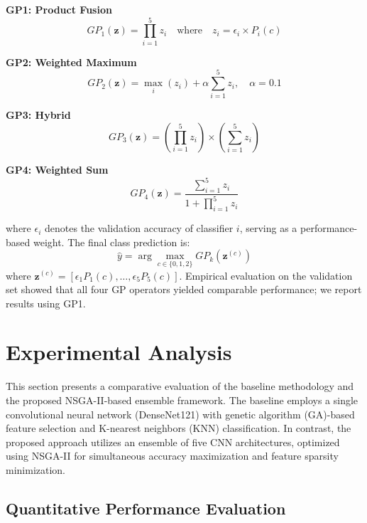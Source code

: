 \documentclass{article}
\begin{document}
\textbf{GP1: Product Fusion}
\begin{equation}
	GP_1(\mathbf{z}) = \prod_{i=1}^{5} z_i \quad \text{where} \quad z_i = \epsilon_i \times P_i(c)
\end{equation}

\textbf{GP2: Weighted Maximum}
\begin{equation}
	GP_2(\mathbf{z}) = \max_i(z_i) + \alpha \sum_{i=1}^{5} z_i, \quad \alpha=0.1
\end{equation}

\textbf{GP3: Hybrid}
\begin{equation}
	GP_3(\mathbf{z}) = \left(\prod_{i=1}^{5} z_i\right) \times \left(\sum_{i=1}^{5} z_i\right)
\end{equation}

\textbf{GP4: Weighted Sum}
\begin{equation}
	GP_4(\mathbf{z}) = \frac{\sum_{i=1}^{5} z_i}{1 + \prod_{i=1}^{5} z_i}
\end{equation}

where $\epsilon_i$ denotes the validation accuracy of classifier $i$, serving as a performance-based weight. The final class prediction is:
\begin{equation}
	\hat{y} = \arg\max_{c \in \{0,1,2\}} GP_k(\mathbf{z}^{(c)})
\end{equation}
where $\mathbf{z}^{(c)} = [\epsilon_1 P_1(c), \ldots, \epsilon_5 P_5(c)]$. Empirical evaluation on the validation set showed that all four GP operators yielded comparable performance; we report results using GP1.

\section{Experimental Analysis}

This section presents a comparative evaluation of the baseline methodology and the proposed NSGA-II-based ensemble framework. The baseline employs a single convolutional neural network (DenseNet121) with genetic algorithm (GA)-based feature selection and K-nearest neighbors (KNN) classification. In contrast, the proposed approach utilizes an ensemble of five CNN architectures, optimized using NSGA-II for simultaneous accuracy maximization and feature sparsity minimization.

\subsection{Quantitative Performance Evaluation}
\end{document}
